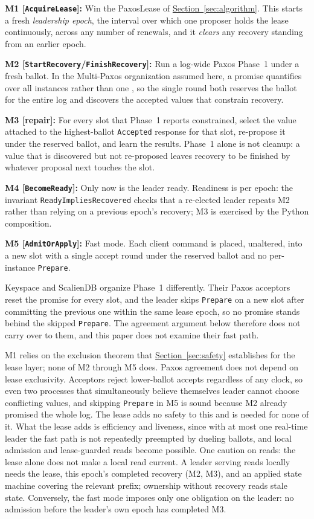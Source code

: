 \documentclass[final,5p,times,twocolumn,number]{elsarticle}
\newcommand{\code}[1]{\texttt{#1}}
\newcommand{\invitem}[1]{\smallskip\noindent\textbf{#1:} }
\newcommand{\secref}[1]{\hyperref[#1]{Section~\ref*{#1}}}
\begin{document}
\invitem{M1 [\code{AcquireLease}]}Win the PaxosLease of \secref{sec:algorithm}.  This starts a fresh \emph{leadership epoch}, the interval over which one proposer holds the lease continuously, across any number of renewals, and it \emph{clears} any recovery standing from an earlier epoch.

\invitem{M2 [\code{StartRecovery}/\code{FinishRecovery}]}Run a log-wide Paxos Phase~1 under a fresh ballot.  In the Multi-Paxos organization assumed here, a promise quantifies over all instances rather than one \cite{ref2,ref9}, so the single round both reserves the ballot for the entire log and discovers the accepted values that constrain recovery.

\invitem{M3 [repair]}For every slot that Phase~1 reports constrained, select the value attached to the highest-ballot \code{Accepted} response for that slot, re-propose it under the reserved ballot, and learn the results.  Phase~1 alone is not cleanup: a value that is discovered but not re-proposed leaves recovery to be finished by whatever proposal next touches the slot.

\invitem{M4 [\code{BecomeReady}]}Only now is the leader ready.  Readiness is per epoch: the invariant \code{ReadyImpliesRecovered} checks that a re-elected leader repeats M2 rather than relying on a previous epoch's recovery; M3 is exercised by the Python composition.

\invitem{M5 [\code{AdmitOrApply}]}Fast mode.  Each client command is placed, unaltered, into a new slot with a single accept round under the reserved ballot and no per-instance \code{Prepare}.

Keyspace and ScalienDB organize Phase~1 differently.  Their Paxos acceptors reset the promise for every slot, and the leader skips \code{Prepare} on a new slot after committing the previous one within the same lease epoch, so no promise stands behind the skipped \code{Prepare}.  The agreement argument below therefore does not carry over to them, and this paper does not examine their fast path.

M1 relies on the exclusion theorem that \secref{sec:safety} establishes for the lease layer; none of M2 through M5 does.  Paxos agreement does not depend on lease exclusivity.  Acceptors reject lower-ballot accepts regardless of any clock, so even two processes that simultaneously believe themselves leader cannot choose conflicting values, and skipping \code{Prepare} in M5 is sound because M2 already promised the whole log.  The lease adds no safety to this and is needed for none of it.  What the lease adds is efficiency and liveness, since with at most one real-time leader the fast path is not repeatedly preempted by dueling ballots, and local admission and lease-guarded reads become possible.  One caution on reads: the lease alone does not make a local read current.  A leader serving reads locally needs the lease, this epoch's completed recovery (M2, M3), and an applied state machine covering the relevant prefix; ownership without recovery reads stale state.  Conversely, the fast mode imposes only one obligation on the leader: no admission before the leader's own epoch has completed M3.
\end{document}
